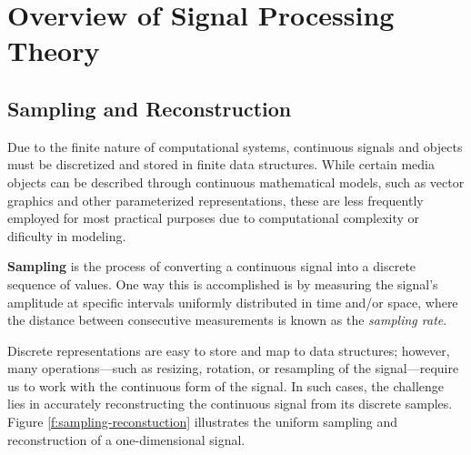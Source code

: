 




\section{Overview of Signal Processing Theory}

\subsection{Sampling and Reconstruction}

Due to the finite nature of computational systems, continuous signals and objects must be discretized and stored in finite data structures. While certain media objects can be described through continuous mathematical models, such as vector graphics and other parameterized representations, these are less frequently employed for most practical purposes due to computational complexity or dificulty in modeling.

\textbf{Sampling} is the process of converting a continuous signal into a discrete sequence of values. One way this is accomplished is by measuring the signal's amplitude at specific intervals uniformly distributed in time and/or space, where the distance between consecutive measurements is known as the \textit{sampling rate}.

Discrete representations are easy to store and map to data structures; however, many operations—such as resizing, rotation, or resampling of the signal—require us to work with the continuous form of the signal. In such cases, the challenge lies in accurately reconstructing the continuous signal from its discrete samples. Figure \ref{f:sampling-reconstuction} illustrates the uniform sampling and reconstruction of a one-dimensional signal.


